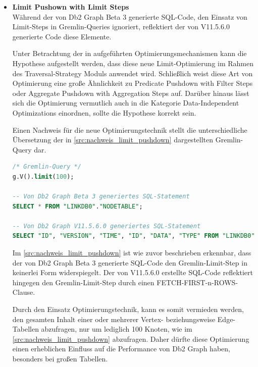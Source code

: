 \begin{itemize}
    \item \textbf{Limit Pushown with Limit Steps}\\
    Während der von Db2 Graph Beta 3 generierte SQL-Code, den Einsatz von Limit-Steps in Gremlin-Queries ignoriert, reflektiert der von V11.5.6.0 generierte Code diese Elemente. 

    Unter Betrachtung der in  aufgeführten Optimierungsmechanismen kann die Hypothese aufgestellt werden, dass diese neue Limit-Optimierung im Rahmen des Traversal-Strategy Moduls anwendet wird. Schließlich weist diese Art von Optimierung eine große Ähnlichkeit zu Predicate Pushdown with Filter Steps oder Aggregate Pushdown with Aggregation Steps auf. Darüber hinaus lässt sich die Optimierung vermutlich auch in die Kategorie Data-Independent Optimizations einordnen, sollte die Hypothese korrekt sein.

    Einen Nachweis für die neue Optimierungstechnik stellt die unterschiedliche Übersetzung der in \autoref{src:nachweis_limit_pushdown} dargestellten Gremlin-Query dar.

\begin{lstlisting}[label=src:nachweis_limit_pushdown,caption={Nachweis Limit Pushdown Optimierung},language=SQL]
/* Gremlin-Query */
g.V().limit(100);

-- Von Db2 Graph Beta 3 generiertes SQL-Statement
SELECT * FROM "LINKDB0"."NODETABLE";

-- Von Db2 Graph V11.5.6.0 generiertes SQL-Statement
SELECT "ID", "VERSION", "TIME", "ID", "DATA", "TYPE" FROM "LINKDB0"."NODETABLE" FETCH FIRST 100 ROWS;
\end{lstlisting}

    Im \autoref{src:nachweis_limit_pushdown} ist wie zuvor beschrieben erkennbar, dass der von Db2 Graph Beta 3 generierte SQL-Code den Gremlin-Limit-Step in keinerlei  Form widerspiegelt. Der von V11.5.6.0 erstellte SQL-Code reflektiert hingegen den Gremlin-Limit-Step durch einen FETCH-FIRST-n-ROWS-Clause.

    Durch den Einsatz Optimierungstechnik, kann es somit vermieden werden, den gesamten Inhalt einer oder mehrerer Vertex- beziehungsweise Edge-Tabellen abzufragen, nur um lediglich 100 Knoten, wie im \autoref{src:nachweis_limit_pushdown} abzufragen. Daher dürfte diese Optimierung einen erheblichen Einfluss auf die Performance von Db2 Graph haben, besonders bei großen Tabellen.


\end{itemize}
